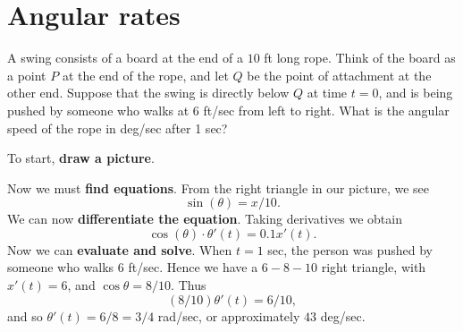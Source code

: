 \documentclass{ximera}
\begin{document}
\section{Angular rates}

\begin{example}
A swing consists of a board at the end of a $10$ ft long rope.  Think
of the board as a point $P$ at the end of the rope, and let $Q$ be the
point of attachment at the other end.  Suppose that the swing is
directly below $Q$ at time $t=0$, and is being pushed by someone who
walks at 6 ft/sec from left to right.  What is the angular speed of
the rope in deg/sec after 1 sec?


\begin{explanation}
To start, \textbf{draw a picture}.
\begin{image}
\end{image}
Now we must \textbf{find equations}. From the right triangle in our
picture, we see
\[
\sin(\theta)=x/10.
\]
We can now \textbf{differentiate the equation}. Taking derivatives we obtain 
\[
\cos(\theta)\cdot \theta'(t)=0.1 x'(t).
\]
Now we can \textbf{evaluate and solve}.  When
$t=1$ sec, the person was pushed by someone who walks $6$
ft/sec. Hence we have a $6-8-10$ right triangle, with $x'(t) = 6$, and
$\cos\theta=8/10$. Thus
\[
(8/10) \theta'(t) =6/10,
\]
and so  $\theta'(t)=6/8=3/4$ rad/sec, or approximately $43$ deg/sec.
\end{explanation} 
\end{example}
\end{document}
